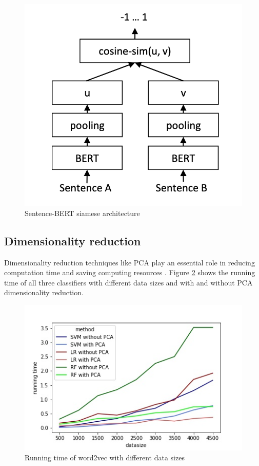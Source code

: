 \documentclass[12pt, a4paper, titlepage]{article}
\begin{document}
\begin{figure}[hb!]
  \center
  \includegraphics[scale=0.5]{SBERT.png}
  \caption{\label{fig: F5} Sentence-\ac{BERT} siamese architecture \citep[3]{reimers2019}}
\end{figure}

\subsection{Dimensionality reduction}
Dimensionality reduction techniques like \ac{PCA} play an essential role in reducing computation time and saving computing resources \citep{ayesha2020}. Figure \ref{fig: F6} shows the running time of all three classifiers with different data sizes and with and without \ac{PCA} dimensionality reduction. 


\begin{figure}[hb!]
  \center
  \includegraphics[scale=0.5]{running_time_PCA.jpeg}
  \caption{\label{fig: F6} Running time of word2vec with different data sizes}
\end{figure}
\end{document}
